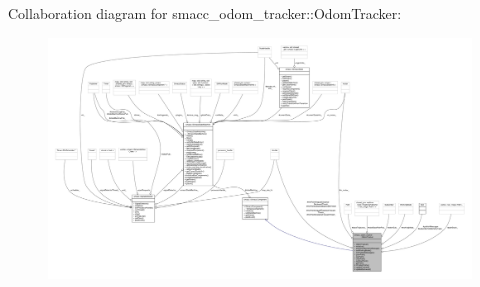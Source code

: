 Collaboration diagram for smacc\+\_\+odom\+\_\+tracker\+:\+:Odom\+Tracker\+:
\nopagebreak
\begin{figure}[H]
\begin{center}
\leavevmode
\includegraphics[width=350pt]{classsmacc__odom__tracker_1_1OdomTracker__coll__graph}
\end{center}
\end{figure}
